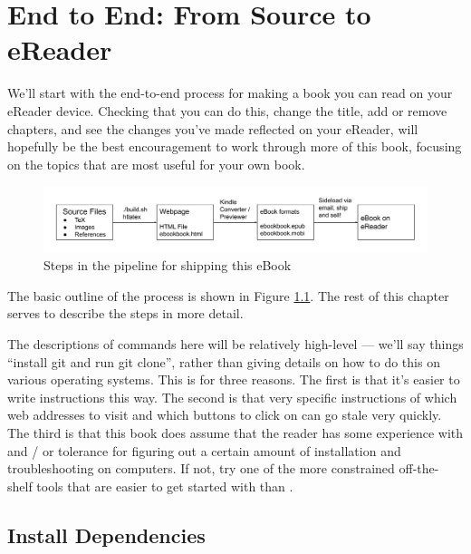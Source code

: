 
\chapter{End to End: From Source to eReader}

We'll start with the end-to-end process for making a book you can read
on your eReader device. Checking that you can do this, change the title,
add or remove chapters, and see the changes you've made reflected on your 
eReader, will hopefully be the best encouragement to work through more
of this book, focusing on the topics that are most useful for your own book.

\begin{figure}
\begin{center}
  \includegraphics[width=1.2\linewidth]{images/pipeline.png}
 \vspace{0.2cm}
\caption{Steps in the pipeline for shipping this eBook}
\end{center}
\label{fig:pipeline}
\vspace{0.4cm}
\end{figure}

The basic outline of the process is shown in Figure \ref{fig:pipeline}.
The rest of this chapter serves to describe the steps in more detail.

The descriptions of commands here will be relatively high-level ---
we'll say things ``install git and run git clone'', rather than giving
details on how to do this on various operating systems. This is for
three reasons. The first is that it's easier to write instructions
this way. The second is that very specific instructions of which web
addresses to visit and which buttons to click on can go stale very
quickly. The third is that this book does assume that the reader has
some experience with and / or tolerance for figuring out a certain
amount of installation and troubleshooting on computers. If not, try one of the
more constrained off-the-shelf tools that are easier to get started with
than \latex. 

\section{Install Dependencies}

